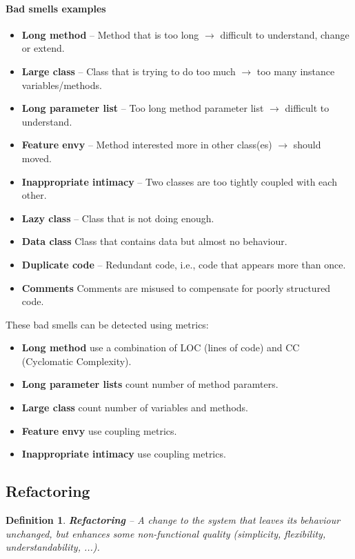 \documentclass[a4paper,11pt]{report}
\newtheorem{definition}{Definition}
\begin{document}
		\paragraph{Bad smells examples}
		\begin{itemize}
			\setlength{\itemsep}{0pt}
			\setlength{\parskip}{0pt}
			\setlength{\parsep}{0pt}
			\item \textbf{Long method} --
				Method that is too long $\rightarrow$
				difficult to understand, change 
				or extend.
			\item \textbf{Large class} -- 
				Class that is trying to do too much
				$\rightarrow$ too many instance
				variables/methods.
			\item \textbf{Long parameter list} --
				Too long method parameter list 
				$\rightarrow$
				difficult to understand.
			\item \textbf{Feature envy} --
				Method interested more in other
				class(es) $\rightarrow$ should 
				moved.
			\item \textbf{Inappropriate intimacy} --
				Two classes are too tightly coupled 
				with each other.
			\item \textbf{Lazy class} --
				Class that is not doing enough.
			\item \textbf{Data class}
				Class that contains data but almost 
				no behaviour.
			\item \textbf{Duplicate code} --
				Redundant code, i.e., code that 
				appears more than once.
			\item \textbf{Comments}
				Comments are misused to compensate 
				for poorly structured code.
		\end{itemize}
		These bad smells can be detected using 
			metrics:
		\begin{itemize}
			\setlength{\itemsep}{0pt}
			\setlength{\parskip}{0pt}
			\setlength{\parsep}{0pt}
			\item \textbf{Long method}
				use a combination of LOC 
				(lines of code) and CC (Cyclomatic
				Complexity).
			\item \textbf{Long parameter lists}
				count number of method paramters.
			\item \textbf{Large class}
				count number of variables and 
				methods.
			\item \textbf{Feature envy}
				use coupling metrics.
			\item \textbf{Inappropriate intimacy}
				use coupling metrics.
		\end{itemize}
	\subsection{Refactoring}
		\begin{definition}
			\textbf{Refactoring} -- 
				A change to the system that leaves its
				behaviour unchanged, but enhances some 
				non-functional quality (simplicity,
				flexibility, understandability, ...).
		\end{definition}
\end{document}

